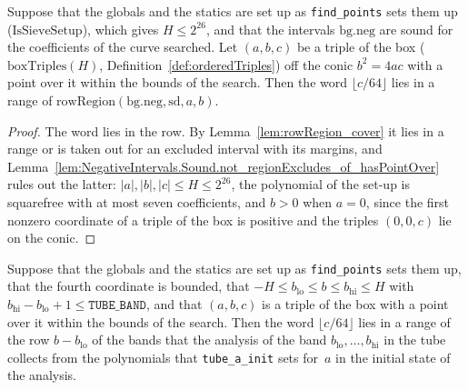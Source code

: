 \begin{lemma}\label{lem:exists_mem_rangeList_rowRegion_of_points_ne_nil}
  \leanok
  Suppose that the globals and the statics are set up as \texttt{find\_points} sets them up
  ($\mathrm{IsSieveSetup}$), which gives $H \le 2^{26}$, and that the intervals
  $\mathrm{bg}.\mathrm{neg}$ are sound for the coefficients of the curve searched. Let $(a, b, c)$
  be a triple of the box ($\mathrm{boxTriples}(H)$, Definition~\ref{def:orderedTriples}) off the
  conic $b^2 = 4ac$ with a point over it within the bounds of the search. Then the word
  $\lfloor c/64 \rfloor$ lies in a range of $\mathrm{rowRegion}(\mathrm{bg}.\mathrm{neg},
  \mathrm{sd}, a, b)$.
\end{lemma}

\begin{proof}
  \leanok
  The word lies in the row. By Lemma~\ref{lem:rowRegion_cover} it lies in a range or is taken out
  for an excluded interval with its margins, and
  Lemma~\ref{lem:NegativeIntervals.Sound.not_regionExcludes_of_hasPointOver} rules out the latter:
  $|a|, |b|, |c| \le H \le 2^{26}$, the polynomial of the set-up is squarefree with at most seven
  coefficients, and $b > 0$ when $a = 0$, since the first nonzero coordinate of a triple of the box
  is positive and the triples $(0, 0, c)$ lie on the conic.
\end{proof}

\begin{lemma}\label{lem:exists_mem_rowRanges_siftBandsBand_of_points_ne_nil}
  \leanok
  Suppose that the globals and the statics are set up as \texttt{find\_points} sets them up, that
  the fourth coordinate is bounded, that $-H \le b_{\mathrm{lo}} \le b \le b_{\mathrm{hi}} \le H$
  with $b_{\mathrm{hi}} - b_{\mathrm{lo}} + 1 \le \mathtt{TUBE\_BAND}$, and that $(a, b, c)$ is a
  triple of the box with a point over it within the bounds of the search. Then the word
  $\lfloor c/64 \rfloor$ lies in a range of the row $b - b_{\mathrm{lo}}$ of the bands that the
  analysis of the band $b_{\mathrm{lo}}, \dots, b_{\mathrm{hi}}$ in the tube collects from the
  polynomials that \texttt{tube\_a\_init} sets for~$a$ in the initial state of the analysis.
\end{lemma}

